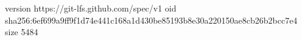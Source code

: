 version https://git-lfs.github.com/spec/v1
oid sha256:6ef699a9ff9f1d74e441c168a1d430be85193b8e30a220150ae8cb26b2bcc7e4
size 5484
